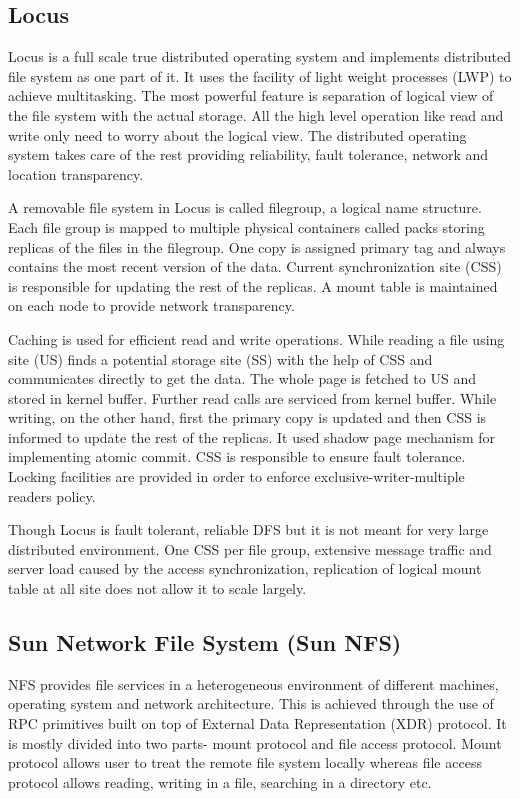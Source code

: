 \documentclass[a4paper,12pt]{article}
\begin{document}
\subsection{Locus \cite[p.~345]{old_dfs}}
\label{sec:locus}
Locus is a full scale true distributed operating system and implements distributed file system as one part of it. It uses the facility of light weight processes (LWP) to achieve multitasking. The most powerful feature is separation of logical view of the file system with the actual storage. All the high level operation like read and write only need to worry about the logical view. The distributed operating system takes care of the rest providing reliability, fault tolerance, network and location transparency.

A removable file system in Locus is called filegroup, a logical name structure. Each file group is mapped to multiple physical containers called packs storing replicas of the files in the filegroup. One copy is assigned primary tag and always contains the most recent version of the data. Current synchronization site (CSS) is responsible for updating the rest of the replicas. A mount table is maintained on each node to provide network transparency.

Caching is used for efficient read and write operations. While reading a file using site (US) finds a potential storage site (SS) with the help of CSS and communicates directly to get the data. The whole page is fetched to US and stored in kernel buffer. Further read calls are serviced from kernel buffer. While writing, on the other hand, first the primary copy is updated and then CSS is informed to update the rest of the replicas. It used shadow page mechanism for implementing atomic commit. CSS is responsible to ensure fault tolerance. Locking facilities are provided in order to enforce exclusive-writer-multiple readers policy.

Though Locus is fault tolerant, reliable DFS but it is not meant for very large distributed environment. One CSS per file group, extensive message traffic and server load caused by the access synchronization, replication of logical mount table at all site does not allow it to scale largely.

\subsection{Sun Network File System (Sun NFS) \cite[p.~351]{old_dfs}}
NFS provides file services in a heterogeneous environment of different machines, operating system and network architecture. This is achieved through the use of RPC primitives built on top of External Data Representation (XDR) protocol. It is mostly divided into two parts- mount protocol and file access protocol. Mount protocol allows user to treat the remote file system locally whereas file access protocol allows reading, writing in a file, searching in a directory etc.
\end{document}
